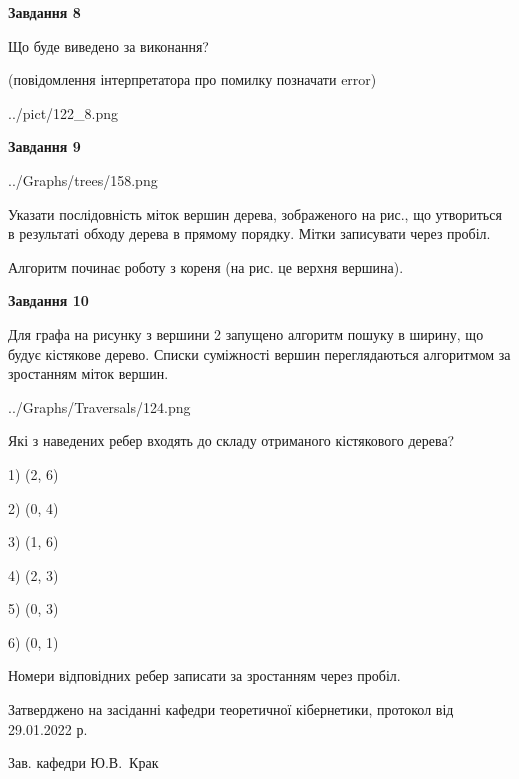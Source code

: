 \documentclass[12pt, ukrainian]{article}
\begin{document}
{\begin {large}
{\begin {center}\textbf{Завдання 8}\end {center}}\par
Що буде виведено за виконання?\par
 (повідомлення інтерпретатора про помилку позначати error)\par
\begin{center}
	{../pict/122_8.png}
\end{center}
\newpage

{\begin {center}\textbf{Завдання 9}\end {center}}\par

\begin{center}
	{../Graphs/trees/158.png}
\end{center}
Указати послідовність міток вершин дерева, зображеного на рис., що утвориться в результаті обходу дерева в прямому порядку. Мітки записувати через пробіл.\par Алгоритм починає роботу з кореня (на рис. це верхня вершина).\par
\newpage

{\begin {center}\textbf{Завдання 10}\end {center}}\par
Для графа на рисунку з вершини 2 запущено алгоритм пошуку в ширину, що будує кістякове дерево. Списки суміжності вершин переглядаються алгоритмом за зростанням міток вершин.\par
\begin{center}
	{../Graphs/Traversals/124.png}
\end{center}
\par Які з наведених ребер входять до складу отриманого кістякового дерева?\par
1) (2, 6)\par
2) (0, 4)\par
3) (1, 6)\par
4) (2, 3)\par
5) (0, 3)\par
6) (0, 1)\par
{\vskip 15pt} Номери відповідних ребер записати за зростанням через пробіл.\par
\newpage


\end {large}
}
{\smallskip \begin {small} Затверджено на засіданні кафедри теоретичної кібернетики, протокол  від   29.01.2022 р.\par\smallskip\smallskip
{\parbox {6.5 cm}{Зав. кафедри \dotfill Ю.В.~Крак}} \end{small}}
\end{document}
